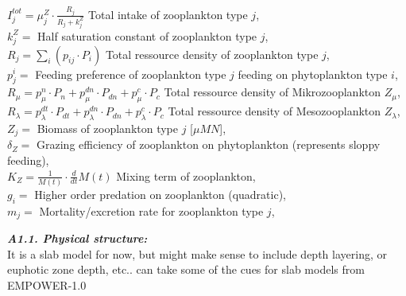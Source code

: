 \documentclass[11pt,letterpaper,english]{article}
\begin{document}
\mbox{} \hspace{.5cm} $I^{tot}_j= \mu^{Z}_j⋅\frac{R_{j}}{R_{j} + k^Z_j}$ Total intake of zooplankton type $j$,\\
\mbox{} \hspace{.5cm} $k^Z_j =$ Half saturation constant of zooplankton type $j$,\\
\mbox{} \hspace{.5cm} $R_{j}= \sum_{i} (p_{i j}⋅P_{i})$ Total ressource density of zooplankton type $j$,\\
\mbox{} \hspace{.5cm} $p^i_{j}=$ Feeding preference of zooplankton type $j$ feeding on phytoplankton type $i$,\\
\mbox{} \hspace{.5cm} $R_{\mu}= p^n_{\mu}⋅P_{n} + p^{dn}_{\mu}⋅P_{dn} + p^c_{\mu}⋅P_{c}$ Total ressource density of Mikrozooplankton $Z_{\mu}$,\\
\mbox{} \hspace{.5cm} $R_{\lambda}= p^{dt}_{\lambda}⋅P_{dt} + p^{dn}_{\lambda}⋅P_{dn} + p^c_{\lambda}⋅P_{c}$ Total ressource density of Mesozooplankton $Z_{\lambda}$,\\



\mbox{} \hspace{.5cm} $Z_j=$ Biomass of zooplankton type $j$ [$\mu M N$],\\
\mbox{} \hspace{.5cm} $\delta_{Z}=$ Grazing efficiency of zooplankton on phytoplankton (represents sloppy feeding), \\
\mbox{} \hspace{.5cm} $K_{Z}=\frac{1}{M(t)} \cdot \frac{d}{d t} M(t)$ Mixing term of zooplankton, \\
\mbox{} \hspace{.5cm} $g_{i}=$ Higher order predation on zooplankton (quadratic), \\
\mbox{} \hspace{.5cm} $m_{j}=$ Mortality/excretion rate for zooplankton type $j$,\\



\vspace{.2cm}

{\it {\bf A1.1. Physical structure:}}\\

It is a slab model for now, but might make sense to include depth layering, or euphotic zone depth, etc.. can take some of the cues for slab models from EMPOWER-1.0
\vspace{.2cm}
\end{document}
